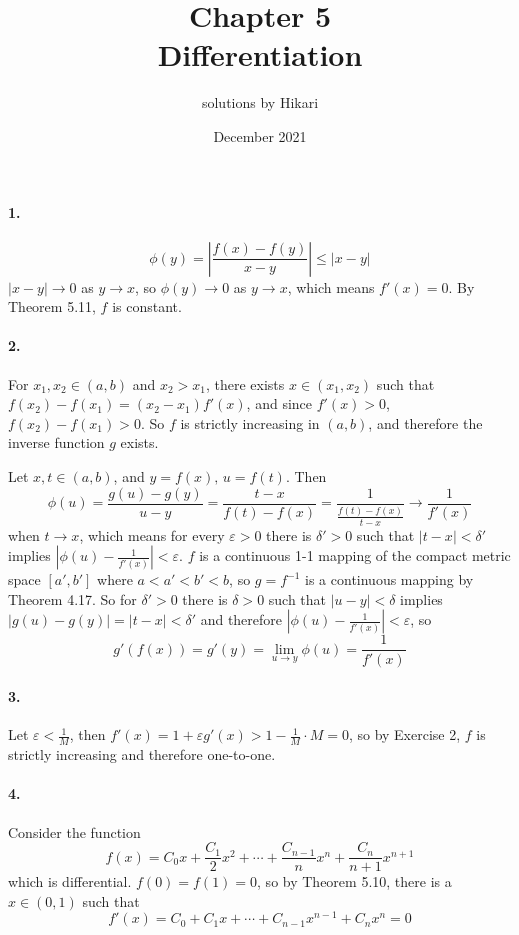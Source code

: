 \documentclass[a4paper]{article}
\title{Chapter 5\\Differentiation}
\author{solutions by Hikari}
\date{December 2021}
\begin{document}
\newcommand{\V}{\mathbf}

\maketitle

\paragraph{1.}
\[
\phi(y)=\left|\frac{f(x)-f(y)}{x-y} \right|\leq |x-y|
\]
$|x-y|\to0$ as $y\to x$, so $\phi(y)\to0$ as $y\to x$, which means $f'(x)=0$. By Theorem 5.11, $f$ is constant.

\paragraph{2.}
For $x_1,x_2\in(a,b)$ and $x_2>x_1$, there exists $x\in(x_1,x_2)$ such that $f(x_2)-f(x_1)=(x_2-x_1)f'(x)$, and since $f'(x)>0$,\; $f(x_2)-f(x_1)>0$. So $f$ is strictly increasing in $(a,b)$, and therefore the inverse function $g$ exists.

Let $x,t\in(a,b)$, and $y=f(x),\,u=f(t)$. Then
\[
\phi(u)=\frac{g(u)-g(y)}{u-y}=\frac{t-x}{f(t)-f(x)}=\frac{1}{\frac{f(t)-f(x)}{t-x}}\to\frac{1}{f'(x)}
\]
when $t\to x$, which means for every $\varepsilon>0$ there is $\delta'>0$ such that $|t-x|<\delta'$ implies $|\phi(u)-\frac{1}{f'(x)}|<\varepsilon$.\; $f$ is a continuous 1-1 mapping of the compact metric space $[a',b']$ where $a<a'<b'<b$, so $g=f^{-1}$ is a continuous mapping by Theorem 4.17. So for $\delta'>0$ there is $\delta>0$ such that $|u-y|<\delta$ implies $|g(u)-g(y)|=|t-x|<\delta'$ and therefore $|\phi(u)-\frac{1}{f'(x)}|<\varepsilon$, so
\[
g'(f(x))=g'(y)=\lim_{u\to y}\phi(u)=\frac{1}{f'(x)}
\]

\paragraph{3.}
Let $\varepsilon<\frac{1}{M}$, then $f'(x)=1+\varepsilon g'(x)>1-\frac{1}{M}\cdot M=0$, so by Exercise 2, $f$ is strictly increasing and therefore one-to-one.

\paragraph{4.}
Consider the function
\[
f(x)=C_0x+\frac{C_1}{2}x^2+\cdots+\frac{C_{n-1}}{n}x^n+\frac{C_n}{n+1}x^{n+1}
\]
which is differential. $f(0)=f(1)=0$, so by Theorem 5.10, there is a $x\in(0,1)$ such that
\[
f'(x)=C_0+C_1x+\cdots+C_{n-1}x^{n-1}+C_nx^n=0
\]
\end{document}
